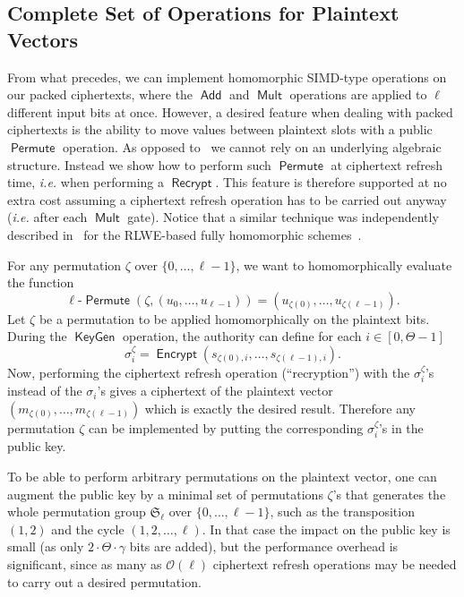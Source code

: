 \documentclass{llncs}
\newcommand{\ie}{\textsl{i.e.}\xspace}
\DeclareMathOperator{\KeyGen}{\ensuremath{\mathsf{KeyGen}}}
\DeclareMathOperator{\Encrypt}{\ensuremath{\mathsf{Encrypt}}}
\DeclareMathOperator{\Recrypt}{\ensuremath{\mathsf{Recrypt}}}
\DeclareMathOperator{\Add}{\ensuremath{\mathsf{Add}}}
\DeclareMathOperator{\Mult}{\ensuremath{\mathsf{Mult}}}
\DeclareMathOperator{\Permute}{\ensuremath{\mathsf{Permute}}}
\renewcommand*\O{\ensuremath{\mathcal O}}
\begin{document}
\subsection{Complete Set of Operations for Plaintext Vectors}\label{subsec:permutations}

From what precedes, we can implement homomorphic SIMD-type operations on
our packed ciphertexts, where the $\Add$ and $\Mult$ operations are
applied to $\ell$ different input bits at once. However, a desired
feature when dealing with packed ciphertexts is the ability to move
values between plaintext slots with a public $\Permute$ operation. As opposed to~\cite{GHS2012a} we cannot rely on an underlying algebraic structure.
Instead we show how to perform  such $\Permute$ at ciphertext refresh
time, \ie when performing a  $\Recrypt$.
This feature is therefore supported at no extra cost assuming a
ciphertext refresh operation has to be carried out anyway (\ie after each
$\Mult$ gate). Notice that  a similar technique was independently
described in~\cite{BGH2013}
for the RLWE-based fully homomorphic schemes~\cite{BV2011a,BV2011b,GHS2012a}.


For any permutation $\zeta$ over $\{0,\ldots,{\ell-1}\}$, we want to homomorphically evaluate the function
\[ \text{$\ell$-$\Permute$}\left(\zeta,\left(u_0,\ldots,u_{\ell-1}\right)\right) = \left(u_{\zeta(0)},\ldots,u_{\zeta({\ell-1})}\right). \]
Let $\zeta$ be a permutation to be applied  homomorphically on the plaintext bits. During the $\KeyGen$ operation, the authority can define for each $i\in[0,\Theta-1]$
\[ \sigma_{i}^{\zeta} = \Encrypt(s_{\zeta(0),i},\ldots,s_{\zeta(\ell-1),i}). \]
Now, performing the ciphertext refresh operation (``recryption'') with the $\sigma_i^\zeta$'s instead of the $\sigma_i$'s gives a ciphertext of the plaintext vector
$(m_{\zeta(0)},\ldots,m_{\zeta(\ell-1)})$
which is exactly the desired result. Therefore any permutation $\zeta$
can be implemented by putting the corresponding $\sigma^\zeta_i$'s in the public key.

To be able to perform arbitrary permutations on the plaintext vector, one
can augment the public key by a minimal set of permutations $\zeta$'s
that generates the whole permutation group $\mathfrak S_\ell$ over $\{0,\ldots,\ell-1\}$, such as
the transposition $(1,2)$ and the cycle $(1,2,\ldots,\ell)$. In that case
the impact on the public key is small (as only $2\cdot \Theta\cdot
\gamma$ bits are added), but the performance overhead is significant,
since as many as $\O(\ell)$ ciphertext refresh operations may be needed to
carry out a desired permutation.
\end{document}
